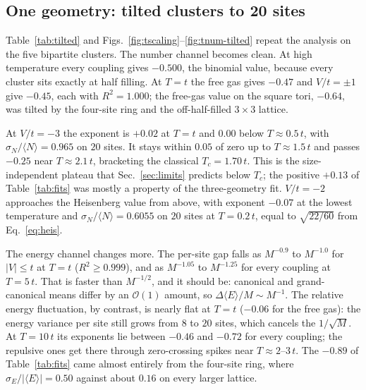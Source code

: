 \documentclass[twocolumn,10pt]{article}
\newcommand{\avg}[1]{\langle #1 \rangle}
\begin{document}
\subsection{One geometry: tilted clusters to 20 sites}\label{sec:tilted}
Table~\ref{tab:tilted} and Figs.~\ref{fig:tscaling}--\ref{fig:tnum-tilted}
repeat the analysis on the five bipartite clusters. The number channel becomes
clean. At high temperature every coupling gives $-0.500$, the binomial value,
because every cluster sits exactly at half filling. At $T=t$ the free gas gives
$-0.47$ and $V/t=\pm1$ give $-0.45$, each with $R^2=1.000$; the free-gas value on
the square tori, $-0.64$, was tilted by the four-site ring and the off-half-filled
$3\times3$ lattice.

At $V/t=-3$ the exponent is $+0.02$ at $T=t$ and $0.00$ below $T\approx0.5\,t$,
with $\sigma_N/\avg N=0.965$ on $20$ sites. It stays within $0.05$ of zero up to
$T\approx1.5\,t$ and passes $-0.25$ near $T\approx2.1\,t$, bracketing the
classical $T_c=1.70\,t$. This is the size-independent plateau that
Sec.~\ref{sec:limits} predicts below $T_c$; the positive $+0.13$ of
Table~\ref{tab:fits} was mostly a property of the three-geometry fit. $V/t=-2$
approaches the Heisenberg value from above, with exponent $-0.07$ at the lowest
temperature and $\sigma_N/\avg N=0.6055$ on $20$ sites at $T=0.2\,t$, equal to
$\sqrt{22/60}$ from Eq.~\eqref{eq:heis}.

The energy channel changes more. The per-site gap falls as $M^{-0.9}$ to
$M^{-1.0}$ for $|V|\le t$ at $T=t$ ($R^2\ge0.999$), and as $M^{-1.05}$ to
$M^{-1.25}$ for every coupling at $T=5\,t$. That is faster than $M^{-1/2}$, and it should be:
canonical and grand-canonical means differ by an $\mathcal O(1)$ amount, so
$\Delta\avg E/M\sim M^{-1}$. The relative energy fluctuation, by contrast, is
nearly flat at $T=t$ ($-0.06$ for the free gas): the energy variance per site
still grows from $8$ to $20$ sites, which cancels the $1/\sqrt M$. At $T=10\,t$
its exponents lie between $-0.46$ and $-0.72$ for every coupling; the repulsive
ones get there through zero-crossing spikes near $T\approx2$--$3\,t$. The $-0.89$ of Table~\ref{tab:fits} came
almost entirely from the four-site ring, where $\sigma_E/|\avg E|=0.50$ against
about $0.16$ on every larger lattice.
\end{document}
